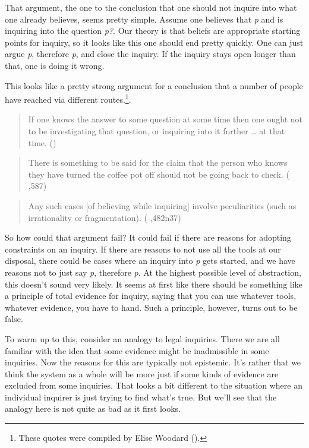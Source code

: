 \documentclass[
  10pt,
  letterpaper,
  twoside]{scrbook}
\begin{document}
That argument, the one to the conclusion that one should not inquire
into what one already believes, seems pretty simple. Assume one believes
that \emph{p} and is inquiring into the question \emph{p?}. Our theory
is that beliefs are appropriate starting points for inquiry, so it looks
like this one should end pretty quickly. One can just argue \emph{p},
therefore \emph{p}, and close the inquiry. If the inquiry stays open
longer than that, one is doing it wrong.

This looks like a pretty strong argument for a conclusion that a number
of people have reached via different routes.\footnote{These quotes were
  compiled by Elise Woodard ().}.

\begin{quote}
If one knows the answer to some question at some time then one ought not
to be investigating that question, or inquiring into it further \ldots{}
at that time. ()
\end{quote}

\begin{quote}
There is something to be said for the claim that the person who knows
they have turned the coffee pot off should not be going back to check.
( ,587)
\end{quote}

\begin{quote}
Any such cases {[}of believing while inquiring{]} involve peculiarities
(such as irrationality or fragmentation).
( ,482n37)
\end{quote}

So how could that argument fail? It could fail if there are reasons for
adopting constraints on an inquiry. If there are reasons to not use all
the tools at our disposal, there could be cases where an inquiry into
\emph{p} gets started, and we have reasons not to just say \emph{p},
therefore \emph{p}. At the highest possible level of abstraction, this
doesn't sound very likely. It seems at first like there should be
something like a principle of total evidence for inquiry, saying that
you can use whatever tools, whatever evidence, you have to hand. Such a
principle, however, turns out to be false.

To warm up to this, consider an analogy to legal inquiries. There we are
all familiar with the idea that some evidence might be inadmissible in
some inquiries. Now the reasons for this are typically not epistemic.
It's rather that we think the system as a whole will be more just if
some kinds of evidence are excluded from some inquiries. That looks a
bit different to the situation where an individual inquirer is just
trying to find what's true. But we'll see that the analogy here is not
quite as bad as it first looks.
\end{document}
